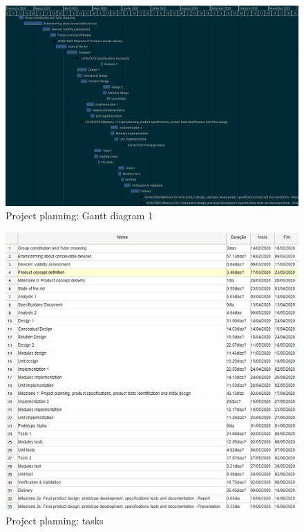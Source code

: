 \begin{figure}[htbp]
\centering
\includegraphics[width=1.0\textwidth]{./sec/img/gantt-diag-orig.png}
\caption{\label{fig:gantt-diag2}Project planning: Gantt diagram 1}
\end{figure}
\begin{figure}[htbp]
\centering
\includegraphics[width=1.0\textwidth]{./sec/img/gantt-orig-tasks.png}
\caption{\label{fig:gantt-tasks}Project planning: tasks}
\end{figure}
